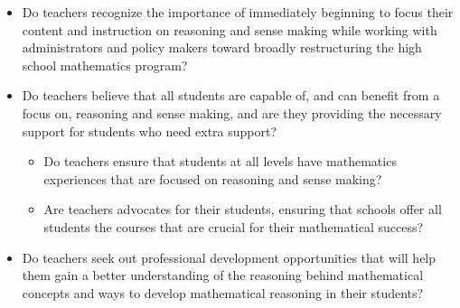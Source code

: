 {{\begin{itemize}
        \item Do teachers recognize the importance of immediately beginning to focus their content and instruction on reasoning and sense making while working with administrators and policy makers toward broadly restructuring the high school mathematics program?\vspace{\baselineskip}
        
        \item Do teachers believe that all students are capable of, and can benefit from a focus on, reasoning and sense making, and are they providing the necessary support for students who need extra support?
          \begin{itemize}
            \item Do teachers ensure that students at all levels have mathematics experiences that are focused on reasoning and sense making?
            
            \item Are teachers advocates for their students, ensuring that schools offer all students the courses that are crucial for their mathematical success?
          \end{itemize}\vspace{\baselineskip}

        \item Do teachers seek out professional development opportunities that will help them gain a better understanding of the reasoning behind mathematical concepts and ways to develop mathematical reasoning in their students?
      \end{itemize}}
  }
